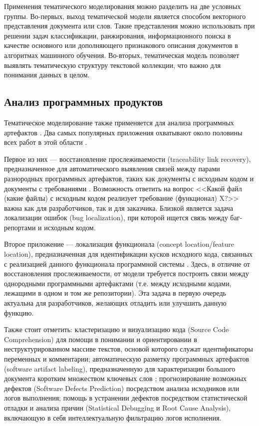 Применения тематического моделирования можно разделить на две условных группы. Во-первых, выход тематической модели является способом векторного представления документа или слов. Такие представления можно использовать при решении задач классификации, ранжирования, информационного поиска в качестве основного или дополняющего признакового описания документов в алгоритмах машинного обучения. Во-вторых, тематическая модель позволяет выявлять тематическую структуру текстовой коллекции, что важно для понимания данных в целом.

\subsection{Анализ программных продуктов}

Тематическое моделирование также применяется для анализа программных артефактов \cite{sun2016exploring,chen2016survey}. Два самых популярных приложения охватывают около половины всех работ в этой области \cite{chen2016survey}.

Первое из них --- восстановление прослеживаемости (traceability link recovery), предназначенное для автоматического выявления связей между парами разнородных программных артефактов, таких как документы с исходным кодом и документы с требованиями \cite{asuncion2010software}. Возможность ответить на вопрос <<Какой файл (какие файлы) с исходным кодом реализует требование (функционал) X?>> важна как для разработчиков, так и для заказчика. Близкой является задача локализации ошибок (bug localization), при которой ищется связь между баг-репортами и исходным кодом.

Второе приложение --- локализация функционала (concept location/feature location), предназначенная для идентификации кусков исходного кода, связанных с реализацией данного функционала программной системы \cite{dit2013feature}. Здесь, в отличие от восстановления прослеживаемости, от модели требуется построить связи между однородными программными артефактами (т.е. между исходными кодами, лежащими в одном и том же репозитории). Эта задача в первую очередь актуальна для разработчиков, желающих отладить или улучшить данную функцию.

Также стоит отметить: кластеризацию и визуализацию кода  (Source Code Comprehension) для помощи в понимании и ориентировании в неструктурированном массиве текстов, основой которого служат идентификаторы переменных и комментарии; автоматическую разметку программных артефактов (software artifact labeling), предназначенную для характеризации большого документа коротким множеством ключевых слов \cite{de2012using}; прогнозирование возможных дефектов (Software Defects Prediction) посредством анализа исходников или логов выполнения; помощь в  устранении дефектов посредством статистической отладки и анализа причин (Statistical Debugging и Root Cause Analysis), включающую в себя интеллектуальную фильтрацию логов исполнения.

